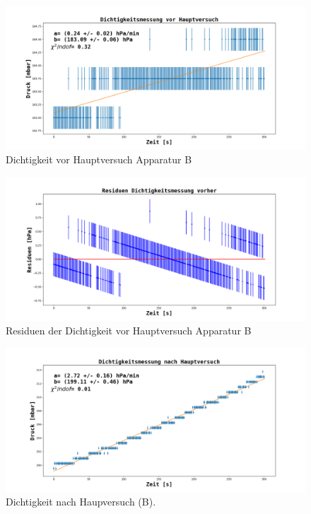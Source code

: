 \documentclass[12pt,a4paper]{article}
\begin{document}
\begin{figure}
\includegraphics[width=\linewidth]{Bilder/Dichtigkeit_vorher_B.png}
\caption[Dichtigkeit vor Hauptversuch Apparatur B]{Dichtigkeit vor Hauptversuch Apparatur B}
\label{fig:DichtigkeitB}
\end{figure}

\begin{figure}
\includegraphics[width=\linewidth]{Bilder/Residuen_Dichtigkeit_vorher_B.png}
\caption[Dichtigkeit vor Hauptversuch Apparatur B]{Residuen der Dichtigkeit vor Hauptversuch Apparatur B}
\label{fig:ResiduenDichtigkeitB}
\end{figure}

\begin{figure}
\includegraphics[width=\linewidth]{Bilder/Dichtigkeit_nachher_B.png}
\caption[Dichtigkeit B nachher]{Dichtigkeit nach Haupversuch (B).}
\label{fig:DichtigkeitNachherB}
\end{figure}
\end{document}
